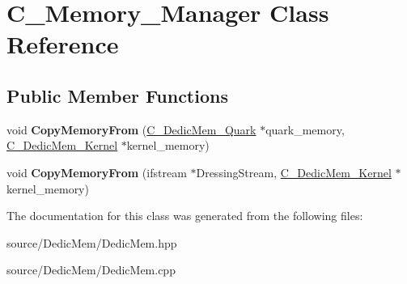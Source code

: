 \hypertarget{class_c___memory___manager}{\section{C\-\_\-\-Memory\-\_\-\-Manager Class Reference}
\label{class_c___memory___manager}
}
\subsection*{Public Member Functions}
\begin{DoxyCompactItemize}
\item 
\hypertarget{class_c___memory___manager_a8463043ee4b5834b69f3c1221420612a}{void {\bfseries Copy\-Memory\-From} (\hyperlink{class_c___dedic_mem___quark}{C\-\_\-\-Dedic\-Mem\-\_\-\-Quark} $\ast$quark\-\_\-memory, \hyperlink{class_c___dedic_mem___kernel}{C\-\_\-\-Dedic\-Mem\-\_\-\-Kernel} $\ast$kernel\-\_\-memory)}\label{class_c___memory___manager_a8463043ee4b5834b69f3c1221420612a}

\item 
\hypertarget{class_c___memory___manager_a34d5adad311f8525b4e29617217c3926}{void {\bfseries Copy\-Memory\-From} (ifstream $\ast$Dressing\-Stream, \hyperlink{class_c___dedic_mem___kernel}{C\-\_\-\-Dedic\-Mem\-\_\-\-Kernel} $\ast$kernel\-\_\-memory)}\label{class_c___memory___manager_a34d5adad311f8525b4e29617217c3926}

\end{DoxyCompactItemize}


The documentation for this class was generated from the following files\-:\begin{DoxyCompactItemize}
\item 
source/\-Dedic\-Mem/Dedic\-Mem.\-hpp\item 
source/\-Dedic\-Mem/Dedic\-Mem.\-cpp\end{DoxyCompactItemize}
